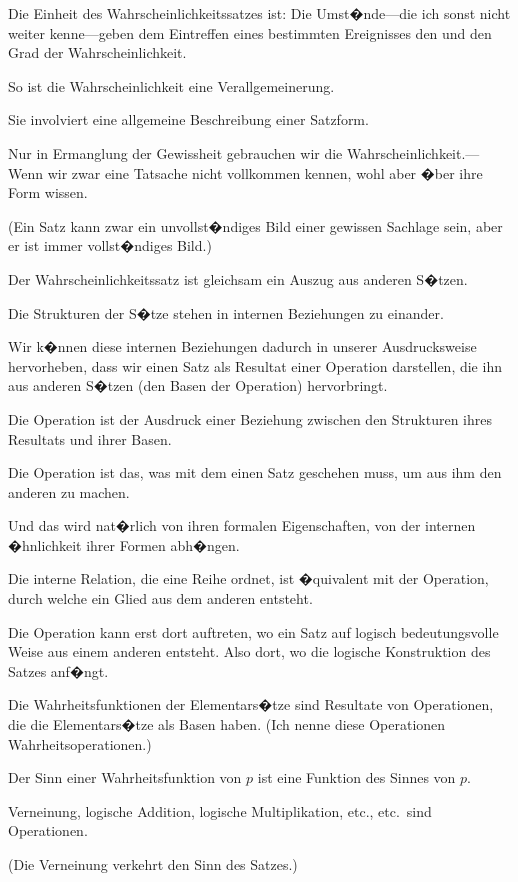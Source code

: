 {Die Einheit des Wahrscheinlichkeitssatzes ist:
Die Umst�nde---die ich sonst nicht weiter kenne---geben
dem Eintreffen eines bestimmten Ereignisses
den und den Grad der Wahrscheinlichkeit.}


{So ist die Wahrscheinlichkeit eine Verallgemeinerung.

Sie involviert eine allgemeine Beschreibung
einer Satzform.

Nur in Ermanglung der Gewissheit gebrauchen
wir die Wahr\-schein\-lich\-keit.---Wenn wir zwar eine
Tatsache nicht vollkommen kennen, wohl aber
 �ber ihre Form wissen.

(Ein Satz kann zwar ein unvollst�ndiges Bild
einer gewissen Sachlage sein, aber er ist immer
 vollst�ndiges Bild.)

Der Wahrscheinlichkeitssatz ist gleichsam ein
Auszug aus anderen S�tzen.}


{Die Strukturen der S�tze stehen in internen
Beziehungen zu einander.}


{Wir k�nnen diese internen Beziehungen
dadurch in unserer Ausdrucksweise hervorheben,
dass wir einen Satz als Resultat einer Operation
darstellen, die ihn aus anderen S�tzen (den Basen
der Operation) hervorbringt.}


{Die Operation ist der Ausdruck einer Beziehung
zwischen den Strukturen ihres Resultats und ihrer
Basen.}


{Die Operation ist das, was mit dem einen Satz
geschehen muss, um aus ihm den anderen zu machen.}


{Und das wird nat�rlich von ihren formalen
Eigenschaften, von der internen �hnlichkeit ihrer
Formen abh�ngen.}


{Die interne Relation, die eine Reihe ordnet, ist
�quivalent mit der Operation, durch welche ein
Glied aus dem anderen entsteht.}


{Die Operation kann erst dort auftreten, wo ein
Satz auf logisch bedeutungsvolle Weise aus einem
anderen entsteht. Also dort, wo die logische
Konstruktion des Satzes anf�ngt.}


{Die Wahrheitsfunktionen der Elementars�tze
sind Resultate von Operationen, die die Elementars�tze
als Basen haben. (Ich nenne diese Operationen
Wahrheitsoperationen.)}


{Der Sinn einer Wahrheitsfunktion von $p$ ist
eine Funktion des Sinnes von $p$.

Verneinung, logische Addition, logische Multiplikation,
etc., etc.\ sind Operationen.

(Die Verneinung verkehrt den Sinn des Satzes.)}


